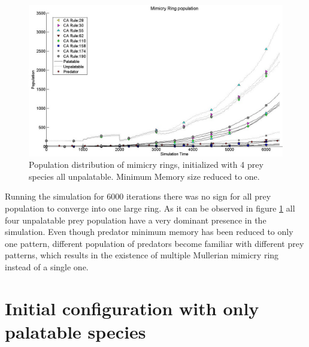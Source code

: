 \begin{figure}[H]
	\centering
	\includegraphics[scale=0.45]{images/simTime6k-4Prey-unp-1-mem}
	\caption[Population distribution of mimicry rings(4 prey, all unpalatable but reduced predator memory)]{Population distribution of mimicry rings, initialized with 4 prey species all unpalatable. Minimum Memory size reduced to one.}
	\label{fig:plot-4-prey-unp-1-mem}
\end{figure}

Running the simulation for 6000 iterations there was no sign for all prey population to converge into one large ring. As it can be observed in figure \ref{fig:plot-4-prey-unp-1-mem} all four unpalatable prey population have a very dominant presence in the simulation. Even though predator minimum memory has been reduced to only one pattern, different population of predators become familiar with different prey patterns, which results in the existence of multiple Mullerian mimicry ring instead of a single one.

\section{Initial configuration with only palatable species}
\label{sec:init-only-palatable-species}

